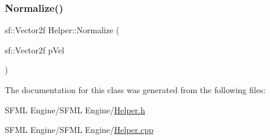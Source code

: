 \subsubsection{\texorpdfstring{Normalize()}{Normalize()}}
{\footnotesize\ttfamily sf\+::\+Vector2f Helper\+::\+Normalize (\begin{DoxyParamCaption}\item[{sf\+::\+Vector2f}]{p\+Vel }\end{DoxyParamCaption})}



The documentation for this class was generated from the following files\+:\begin{DoxyCompactItemize}
\item 
S\+F\+M\+L Engine/\+S\+F\+M\+L Engine/\hyperlink{_helper_8h}{Helper.\+h}\item 
S\+F\+M\+L Engine/\+S\+F\+M\+L Engine/\hyperlink{_helper_8cpp}{Helper.\+cpp}\end{DoxyCompactItemize}
